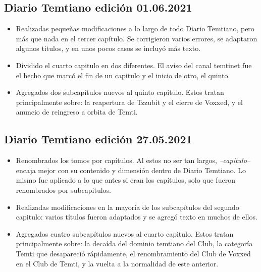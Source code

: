\documentclass[
  spanish,
]{book}
\begin{document}
\hypertarget{diario-temtiano-ediciuxf3n-01.06.2021}{%
\subsection*{Diario Temtiano edición 01.06.2021}\label{diario-temtiano-ediciuxf3n-01.06.2021}}

\begin{itemize}
\item
  Realizadas pequeñas modificaciones a lo largo de todo Diario Temtiano, pero más que nada en el tercer capítulo. Se corrigieron varios errores, se adaptaron algunos titulos, y en unos pocos casos se incluyó más texto.
\item
  Dividido el cuarto capitulo en dos diferentes. El aviso del canal temtinet fue el hecho que marcó el fin de un capitulo y el inicio de otro, el quinto.
\item
  Agregados dos subcapítulos nuevos al quinto capitulo. Estos tratan principalmente sobre: la reapertura de Tzzubit y el cierre de Voxxed, y el anuncio de reingreso a orbita de Temti.
\end{itemize}

\hypertarget{diario-temtiano-ediciuxf3n-27.05.2021}{%
\subsection*{Diario Temtiano edición 27.05.2021}\label{diario-temtiano-ediciuxf3n-27.05.2021}}

\begin{itemize}
\item
  Renombrados los tomos por capítulos. Al estos no ser tan largos, \emph{--capitulo--} encaja mejor con su contenido y dimensión dentro de Diario Temtiano. Lo mismo fue aplicado a lo que antes si eran los capítulos, solo que fueron renombrados por subcapitulos.
\item
  Realizadas modificaciones en la mayoría de los subcapítulos del segundo capitulo: varios títulos fueron adaptados y se agregó texto en muchos de ellos.
\item
  Agregados cuatro subcapítulos nuevos al cuarto capitulo. Estos tratan principalmente sobre: la decaída del dominio temtiano del Club, la categoría Temti que desapareció rápidamente, el renombramiento del Club de Voxxed en el Club de Temti, y la vuelta a la normalidad de este anterior.
\end{itemize}
\end{document}

